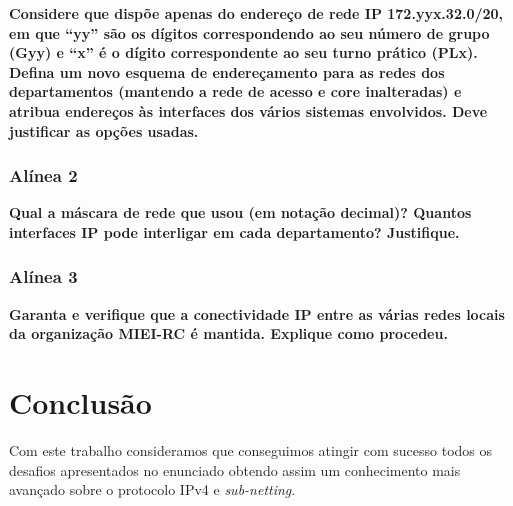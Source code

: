 \documentclass[a4paper]{report}
\begin{document}
\textbf{Considere que dispõe apenas do endereço de rede IP 172.yyx.32.0/20, em
que “yy” são os dígitos correspondendo ao seu número de grupo (Gyy) e “x” é o
dígito correspondente ao seu turno prático (PLx). Defina um novo esquema de
endereçamento para as redes dos departamentos (mantendo a rede de acesso e core
inalteradas) e atribua endereços às interfaces dos vários sistemas envolvidos.
Deve justificar as opções usadas.}

\subsection{Alínea 2}
\textbf{Qual a máscara de rede que usou (em notação decimal)? Quantos interfaces
IP pode interligar em cada departamento? Justifique.}

\subsection{Alínea 3}
\textbf{Garanta e verifique que a conectividade IP entre as várias redes locais
da organização MIEI-RC é mantida. Explique como procedeu.}

\chapter{Conclusão}
Com este trabalho consideramos que conseguimos atingir com sucesso todos os
desafios apresentados no enunciado obtendo assim um conhecimento mais avançado
sobre o protocolo IPv4 e \textit{sub-netting}.
\end{document}
